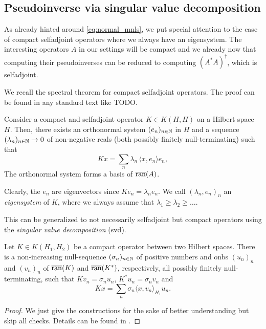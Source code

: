 \begin{lemma}

\section{Pseudoinverse via singular value decomposition}
\label{section:spectral_pinv}

As already hinted around \cref{eq:normal_mnls}, 
we put special attention to the case of compact 
selfadjoint operators where we always have an eigensystem.
The interesting operators $A$ in our settings
will be compact and we already now that computing
their pseudoinverses can be reduced to computing 
$(A^* A)^\dagger$, which is selfadjoint.

We recall the spectral theorem for compact selfadjoint operators.
The proof can be found in any standard text like TODO.
\begin{thm}
\label{thm:spectral}
    Consider a compact and selfadjoint operator $K \in K(H,H)$ on 
    a Hilbert space $H$.
    Then, there exists an orthonormal system $(e_n)_{n\in\mathbb{N}}$ in $H$ 
    and a sequence $(\lambda_n)_{n \in \mathbb{N}} \to 0$ of non-negative 
    reals (both possibly finitely null-terminating) such that 
    \begin{equation*}
        K x = \sum_n \lambda_n \, \langle x,e_n \rangle e_n,
    \end{equation*}
    The orthonormal system forms a basis of $\overline{\operatorname{ran}}(A)$.
\end{thm}
Clearly, the $e_n$ are eigenvectors since $K e_n = \lambda_n e_n$.
We call $( \lambda_n, e_n )_n$ an \emph{eigensystem} of $K$,
where we always assume that $\lambda_1 \geq \lambda_2 \geq \dots$.

This can be generalized to not necessarily selfadjoint but 
compact operators using the \emph{singular value decomposition}
(svd). 
\begin{thm}
    Let $K \in K(H_1,H_2)$ be a compact operator between two 
    Hilbert spaces.
    There is a non-increasing null-sequence $(\sigma_n)_{n \in \mathbb{N}}$ 
    of positive numbers and 
    onbs $(u_n)_n$ and $(v_n)_n$ of $\overline{\operatorname{ran}}(K)$ and 
    $\overline{\operatorname{ran}}(K^*)$, respectively, all possibly finitely
    null-terminating, such that
    $K v_n = \sigma_n u_n$, $K^* u_n = \sigma_n v_n$ and 
    \begin{equation}\label{eq:svd}
        K x = \sum_n \sigma_n \langle x, v_n \rangle_{H_1} u_n.
    \end{equation}
\end{thm}
\begin{proof}
    We just give the constructions for the sake of better 
    understanding but skip all checks.
    Details can be found in \cite[Theorem 3.9]{clason}.


\end{proof}
\end{lemma}
